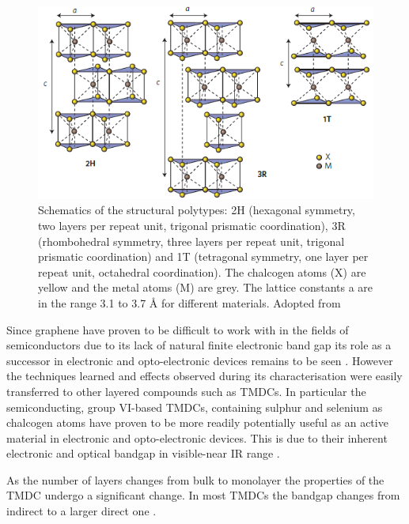 \begin{figure}[ht]
	\begin{center}
		\includegraphics[scale=0.7]{TMDCPolytypes.png}
		\caption{Schematics of the structural polytypes: 2H (hexagonal symmetry, two layers per repeat unit, trigonal prismatic coordination), 3R (rhombohedral symmetry, three layers per repeat unit, trigonal prismatic coordination) and 1T (tetragonal symmetry, one layer per repeat unit, octahedral coordination). The chalcogen atoms (X) are yellow and the metal atoms (M) are grey. The lattice constants a are in the range 3.1 to 3.7 \r{A} for different materials. Adopted from \cite{ElectronicsAndOptoelectronicsOfTwo-dimensionalTransitionMetalDichalcogenides}}
		\label{fig:TMDCPolytypes}
	\end{center}
\end{figure}

Since graphene have proven to be difficult to work with in the fields of semiconductors due to its lack of natural finite electronic band gap its role as a successor in electronic and opto-electronic devices remains to be seen \cite{Wang2018}. However the techniques learned and effects observed during its characterisation were easily transferred to other layered compounds such as TMDCs. In particular the semiconducting, group VI-based TMDCs, containing sulphur and selenium as chalcogen atoms have proven to be more readily potentially useful as an active material in electronic and opto-electronic devices. This is due to their inherent electronic and optical bandgap in visible-near IR range \cite{ElectronicsAndOptoelectronicsOfTwo-dimensionalTransitionMetalDichalcogenides}.
	
As the number of layers changes from bulk to monolayer the properties of the TMDC undergo a significant change. In most TMDCs the bandgap changes from indirect to a larger direct one \cite{ElectronicsAndOptoelectronicsOfTwo-dimensionalTransitionMetalDichalcogenides}. 
	
